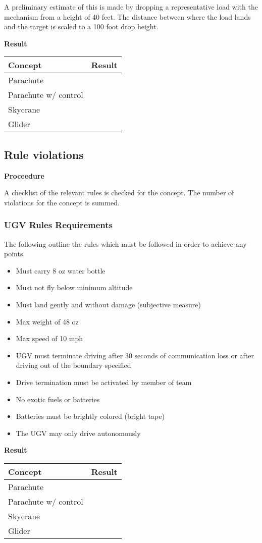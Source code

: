 \documentclass[]{auvsi_doc}
\begin{document}
	A preliminary estimate of this is made by dropping a representative load with the mechanism from a height of 40 feet. The distance between where the load lands and the target is scaled to a 100 foot drop height.

	\textbf{Result}

	\begin{tabular}{|l|l|}
		\hline
		\textbf{Concept}       & \textbf{Result} \\
		\hline
		Parachute              &                 \\
		Parachute w/ control   &                 \\
		Skycrane               &                 \\
		Glider                 &				 \\
		\hline
	\end{tabular}

	\subsection{Rule violations}
	\textbf{Proceedure}

	A checklist of the relevant rules is checked for the concept. The number of violations for the concept is summed.

\subsubsection{UGV Rules Requirements}
The following outline the rules which must be followed in order to achieve any points. 
\begin{itemize}
\item Must carry 8 oz water bottle
\item Must not fly below minimum altitude
\item Must land gently and without damage (subjective measure)
\item Max weight of 48 oz
\item Max speed of 10 mph
\item UGV must terminate driving after 30 seconds of communication loss or after driving out of the boundary specified
\item Drive termination must be activated by member of team
\item No exotic fuels or batteries
\item Batteries must be brightly colored (bright tape)
\item The UGV may only drive autonomously
\end{itemize}

	\textbf{Result}

	\begin{tabular}{|l|l|}
		\hline
		\textbf{Concept}       & \textbf{Result} \\
		\hline
		Parachute              &                 \\
		Parachute w/ control   &                 \\
		Skycrane               &                 \\
		Glider                 &				 \\
		\hline
	\end{tabular}
\end{document}
